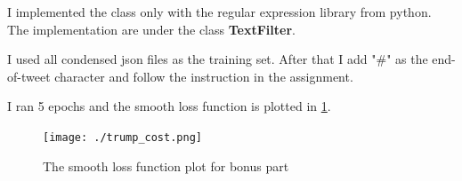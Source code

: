 \documentclass[12pt]{article}
\begin{document}
I implemented the class only with the regular expression library from python.
The implementation are under the class \textbf{TextFilter}.

I used all condensed json files as the training set.
After that I add "\#" as the end-of-tweet character and follow the instruction
in the assignment.

I ran 5 epochs and the smooth loss function is plotted in \cref{plt:trump_smooth_loss}.

\begin{figure}[h]
    \centering
    \texttt{[image: ./trump\_cost.png]}
    \caption{The smooth loss function plot for bonus part}
    \label{plt:trump_smooth_loss}
\end{figure}
\end{document}
